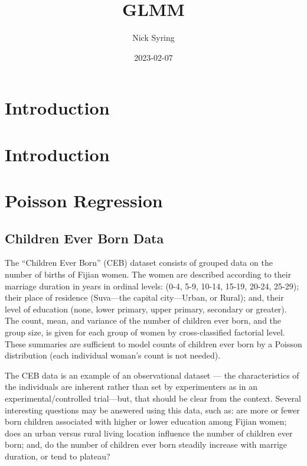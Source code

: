 \documentclass[
]{book}
\title{GLMM}
\author{Nick Syring}
\date{2023-02-07}
\begin{document}
\maketitle

{
\setcounter{tocdepth}{1}
\tableofcontents
}
\hypertarget{introduction}{%
\chapter{Introduction}\label{introduction}}

\hypertarget{intro}{%
\chapter{Introduction}\label{intro}}

\hypertarget{poisson-regression}{%
\chapter{Poisson Regression}\label{poisson-regression}}

\hypertarget{children-ever-born-data}{%
\section{Children Ever Born Data}\label{children-ever-born-data}}

The ``Children Ever Born'' (CEB) dataset consists of grouped data on the number of births of Fijian women. The women are described according to their marriage duration in years in ordinal levels: (0-4, 5-9, 10-14, 15-19, 20-24, 25-29); their place of residence (Suva---the capital city---Urban, or Rural); and, their level of education (none, lower primary, upper primary, secondary or greater). The count, mean, and variance of the number of children ever born, and the group size, is given for each group of women by cross-classified factorial level. These summaries are sufficient to model counts of children ever born by a Poisson distribution (each individual woman's count is not needed).

The CEB data is an example of an observational dataset --- the characteristics of the individuals are inherent rather than set by experimenters as in an experimental/controlled trial---but, that should be clear from the context. Several interesting questions may be answered using this data, such as: are more or fewer born children associated with higher or lower education among Fijian women; does an urban versus rural living location influence the number of children ever born; and, do the number of children ever born steadily increase with marrige duration, or tend to plateau?
\end{document}
